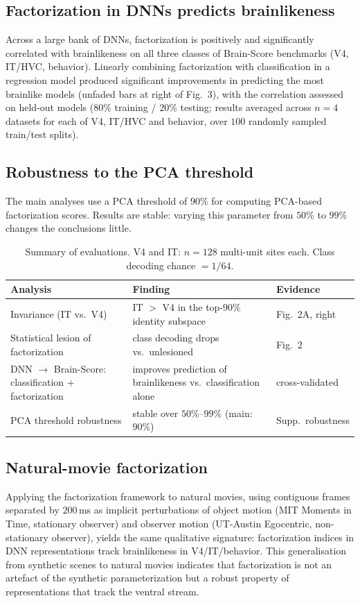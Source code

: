 \documentclass[11pt]{article}
\begin{document}
\subsection{Factorization in DNNs predicts brainlikeness}
Across a large bank of DNNs, factorization is positively and significantly correlated with brainlikeness on all three classes of Brain-Score benchmarks (V4, IT/HVC, behavior). Linearly combining factorization with classification in a regression model produced significant improvements in predicting the most brainlike models (unfaded bars at right of Fig.~3), with the correlation assessed on held-out models ($80\%$ training / $20\%$ testing; results averaged across $n=4$ datasets for each of V4, IT/HVC and behavior, over $100$ randomly sampled train/test splits).

\subsection{Robustness to the PCA threshold}
The main analyses use a PCA threshold of $90\%$ for computing PCA-based factorization scores. Results are stable: varying this parameter from $50\%$ to $99\%$ changes the conclusions little.

\begin{table}[h]
\centering
\caption{Summary of evaluations. V4 and IT: $n = 128$ multi-unit sites each. Class decoding chance $= 1/64$.}
\label{tab:summary}
\begin{tabular}{lll}
\toprule
Analysis & Finding & Evidence \\
\midrule
Invariance (IT vs.\ V4) & IT $>$ V4 in the top-$90\%$ identity subspace & Fig.~2A, right \\
Statistical lesion of factorization & class decoding drops vs.\ unlesioned & Fig.~2 \\
DNN $\to$ Brain-Score: classification + factorization & improves prediction of brainlikeness vs.\ classification alone & cross-validated \\
PCA threshold robustness & stable over $50\%$--$99\%$ (main: $90\%$) & Supp.\ robustness \\
\bottomrule
\end{tabular}
\end{table}

\subsection{Natural-movie factorization}
Applying the factorization framework to natural movies, using contiguous frames separated by $200$\,ms as implicit perturbations of object motion (MIT Moments in Time, stationary observer) and observer motion (UT-Austin Egocentric, non-stationary observer), yields the same qualitative signature: factorization indices in DNN representations track brainlikeness in V4/IT/behavior. This generalisation from synthetic scenes to natural movies indicates that factorization is not an artefact of the synthetic parameterization but a robust property of representations that track the ventral stream.
\end{document}
